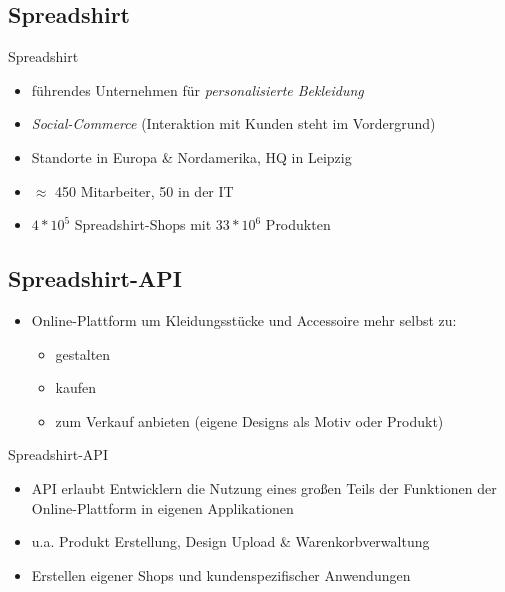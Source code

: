 \subsection{Spreadshirt}
\begin{frame}{Spreadshirt}
    \begin{itemize}
        \item führendes Unternehmen für \emph{personalisierte Bekleidung}
        \item \emph{Social-Commerce} (Interaktion mit Kunden steht im Vordergrund) %
        \item Standorte in Europa \& Nordamerika, HQ in Leipzig
        \item $\approx$ 450 Mitarbeiter, 50 in der IT
        \item $4*10^5$ Spreadshirt-Shops mit $33*10^6$ Produkten
    \end{itemize}
\end{frame}

\subsection{Spreadshirt-API}
\begin{frame}[squeeze]
    \begin{itemize}
        \item Online-Plattform um Kleidungsstücke und Accessoire mehr selbst zu:
        \begin{itemize}
            \item gestalten
            \item kaufen
            \item zum Verkauf anbieten (eigene Designs als Motiv oder Produkt)
        \end{itemize}
    \end{itemize}

    \begin{block}{Spreadshirt-API}
        \begin{itemize}
            \item API erlaubt Entwicklern die Nutzung eines großen Teils der Funktionen der Online-Plattform in eigenen Applikationen
            \item u.a. Produkt Erstellung, Design Upload \& Warenkorbverwaltung
            \item Erstellen eigener Shops und kundenspezifischer Anwendungen %
        \end{itemize}
    \end{block}
\end{frame}

